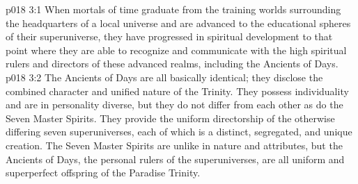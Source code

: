 \vs p018 3:1 When mortals of time graduate from the training worlds surrounding the headquarters of a local universe and are advanced to the educational spheres of their superuniverse, they have progressed in spiritual development to that point where they are able to recognize and communicate with the high spiritual rulers and directors of these advanced realms, including the Ancients of Days.
\vs p018 3:2 The Ancients of Days are all basically identical; they disclose the combined character and unified nature of the Trinity. They possess individuality and are in personality diverse, but they do not differ from each other as do the Seven Master Spirits. They provide the uniform directorship of the otherwise differing seven superuniverses, each of which is a distinct, segregated, and unique creation. The Seven Master Spirits are unlike in nature and attributes, but the Ancients of Days, the personal rulers of the superuniverses, are all uniform and superperfect offspring of the Paradise Trinity.
